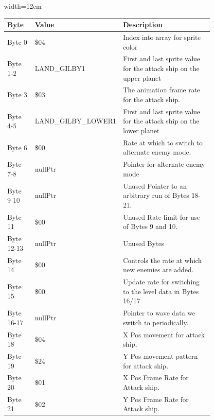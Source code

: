 \begin{figure}[H]
{\begin{adjustbox}{width=12cm}
\begin{tabular}{lll}
\toprule
 Byte       & Value                     & Description                                                         \\
\midrule
 Byte 0     & \$04                       & Index into array for sprite color                                   \\
 Byte 1-2   & LAND\_GILBY1               & First and last sprite value for the attack ship on the upper planet \\
 Byte 3     & \$03                       & The animation frame rate for the attack ship.                       \\
 Byte 4-5   & LAND\_GILBY\_LOWER1   & First and last sprite value for the attack ship on the lower planet \\
 Byte 6     & \$00                       & Rate at which to switch to alternate enemy mode.                    \\
 Byte 7-8   & nullPtr                   & Pointer for alternate enemy mode                                    \\
 Byte 9-10  & nullPtr                   & Unused Pointer to an arbitrary run of Bytes 18-21.                  \\
 Byte 11    & \$00                       & Unused Rate limit for use of Bytes 9 and 10.                        \\
 Byte 12-13 & nullPtr                   & Unused Bytes                                                        \\
 Byte 14    & \$00                       & Controls the rate at which new enemies are added.                   \\
 Byte 15    & \$00                       & Update rate for switching to the level data in Bytes 16/17          \\
 Byte 16-17 & nullPtr                   & Pointer to wave data we switch to periodically.                     \\
 Byte 18    & \$04                       & X Pos movement for attack ship.                                     \\
 Byte 19    & \$24                       & Y Pos movement pattern for attack ship.                             \\
 Byte 20    & \$01                       & X Pos Frame Rate for Attack ship.                                   \\
 Byte 21    & \$02                       & Y Pos Frame Rate for Attack ship.                                   \\

\end{tabular}
\end{adjustbox}}
\end{figure}
